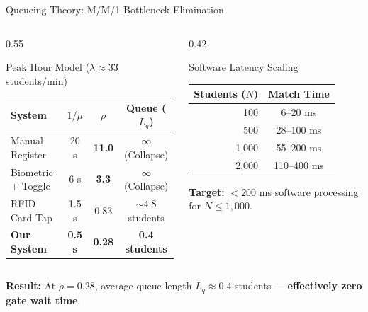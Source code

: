 \documentclass[aspectratio=169, 11pt]{beamer}
\begin{document}
\begin{frame}{Queueing Theory: M/M/1 Bottleneck Elimination}
  \begin{columns}[T]
    \begin{column}{0.55\textwidth}
      \begin{block}{Peak Hour Model ($\lambda \approx 33$ students/min)}
        \small
        \renewcommand{\arraystretch}{1.25}
        \begin{tabular}{lccc}
          \toprule
          \textbf{System} & $1/\mu$ & $\rho$ & \textbf{Queue ($L_q$)} \\
          \midrule
          Manual Register & 20 s & \textcolor{DangerRed}{\textbf{11.0}} & $\infty$ (Collapse) \\
          Biometric + Toggle & 6 s & \textcolor{DangerRed}{\textbf{3.3}} & $\infty$ (Collapse) \\
          RFID Card Tap & 1.5 s & 0.83 & $\sim$4.8 students \\
          \midrule
          \textbf{Our System} & \textbf{0.5 s} & \textcolor{CodeGreen}{\textbf{0.28}} & \textcolor{CodeGreen}{\textbf{0.4 students}} \\
          \bottomrule
        \end{tabular}
      \end{block}
    \end{column}
    \begin{column}{0.42\textwidth}
      \begin{block}{Software Latency Scaling}
        \small
        \renewcommand{\arraystretch}{1.15}
        \begin{tabular}{rc}
          \toprule
          \textbf{Students ($N$)} & \textbf{Match Time} \\
          \midrule
          100 & 6--20 ms \\
          500 & 28--100 ms \\
          1,000 & 55--200 ms \\
          2,000 & 110--400 ms \\
          \bottomrule
        \end{tabular}
        \vspace{0.3em}
        \small
        \textbf{Target:} $< 200$ ms software processing for $N \leq 1{,}000$.
      \end{block}
    \end{column}
  \end{columns}
  \vspace{0.3em}
  \begin{center}
    \colorbox{CodeGreen!12}{\parbox{0.88\textwidth}{\centering\small
      \textbf{Result:} At $\rho = 0.28$, average queue length $L_q \approx 0.4$ students — \textbf{effectively zero gate wait time}.
    }}
  \end{center}
\end{frame}
\end{document}
